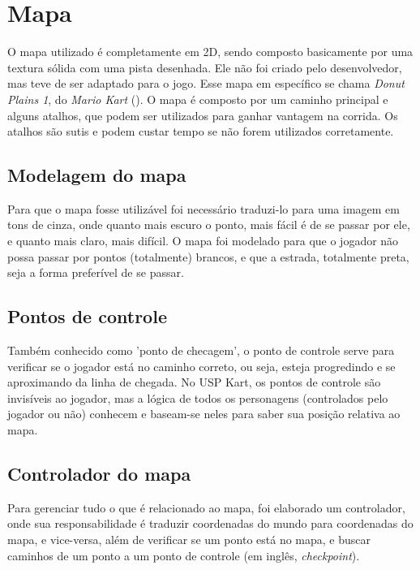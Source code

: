 \section{Mapa}

O mapa utilizado é completamente em 2D, sendo composto basicamente por uma textura sólida com uma pista desenhada. Ele não foi criado pelo desenvolvedor, mas teve de ser adaptado para o jogo. Esse mapa em específico se chama \textit{Donut Plains 1}, do \textit{Mario Kart} (\cite{marioKart}). O mapa é composto por um caminho principal e alguns atalhos, que podem ser utilizados para ganhar vantagem na corrida. Os atalhos são sutis e podem custar tempo se não forem utilizados corretamente.

\subsection{Modelagem do mapa}

Para que o mapa fosse utilizável foi necessário traduzi-lo para uma imagem em tons de cinza, onde quanto mais escuro o ponto, mais fácil é de se passar por ele, e quanto mais claro, mais difícil. O mapa foi modelado para que o jogador não possa passar por pontos (totalmente) brancos, e que a estrada, totalmente preta, seja a forma preferível de se passar.
\subsection{Pontos de controle}

Também conhecido como 'ponto de checagem', o ponto de controle serve para verificar se o jogador está no caminho correto, ou seja, esteja progredindo e se aproximando da linha de chegada. No USP Kart, os pontos de controle são invisíveis ao jogador, mas a lógica de todos os personagens (controlados pelo jogador ou não) conhecem e baseam-se neles para saber sua posição relativa ao mapa.

\subsection{Controlador do mapa}\label{sec:controlador-do-mapa}

Para gerenciar tudo o que é relacionado ao mapa, foi elaborado um controlador, onde sua responsabilidade é traduzir coordenadas do mundo para coordenadas do mapa, e vice-versa, além de verificar se um ponto está no mapa, e buscar caminhos de um ponto a um ponto de controle (em inglês, \textit{checkpoint}).

